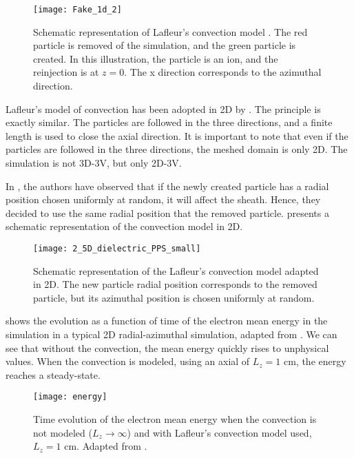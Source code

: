     \begin{figure}[hbt]
      \centering
      \texttt{[image: Fake\_1d\_2]}
      \caption{Schematic representation of Lafleur's convection model \citep{lafleur2016a}. The red particle is removed of the simulation, and the green particle is created. In this illustration, the particle is an ion, and the reinjection is at $z=0$. The x direction corresponds to the azimuthal direction.}
      \label{fig-Fake_1d_1}
    \end{figure}

    Lafleur's model of convection has been adopted in \ac{2D} by \citet{croes2017a}.
    The principle is exactly similar.
    The particles are followed in the three directions, and a finite length is used to close the axial direction.
    It is important to note that even if the particles are followed in the three directions, the meshed domain is only \ac{2D}.
    The simulation is not \ac{3D}-\ac{3V}, but only \ac{2D}-\ac{3V}.

    In \citet{croes2017a}, the authors have observed that if the newly created particle has a radial position chosen uniformly at random, it will affect the sheath.
    Hence, they decided to use the same radial position that the removed particle.
     presents a schematic representation of the convection model in \ac{2D}.

    \begin{figure}[hbt]
      \centering
      \texttt{[image: 2\_5D\_dielectric\_PPS\_small]}
      \caption{Schematic representation of the Lafleur's convection model adapted in \acs{2D}. The new particle radial position corresponds to the removed particle, but its azimuthal position is chosen uniformly at random. }
      \label{fig-Fake_2d}
    \end{figure}

     shows the evolution as a function of time of the electron mean energy in the simulation in a typical \ac{2D} radial-azimuthal simulation, adapted from \citet{croes2017}.
    We can see that without the convection, the mean energy quickly rises to unphysical values.
    When the convection is modeled, using an axial of $L_z=1$ cm, the energy reaches a steady-state.
    \begin{figure}[hbt]
      \centering
      \texttt{[image: energy]}
      \caption{Time evolution of the electron mean energy when the convection is not modeled ($L_z \rightarrow \infty$) and with Lafleur's convection model used, $L_z = 1$ cm. Adapted from \citet{croes2017}.}
      \label{fig-energy_convection}
    \end{figure}



